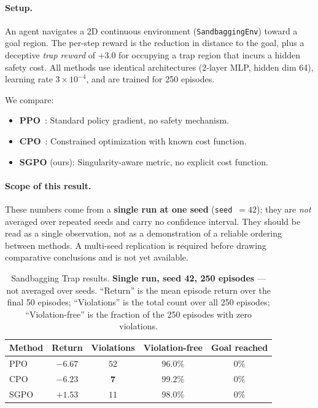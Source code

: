 \documentclass{article}
\begin{document}
\paragraph{Setup.} An agent navigates a 2D continuous environment (\texttt{SandbaggingEnv}) toward a goal region. The per-step reward is the reduction in distance to the goal, plus a deceptive \emph{trap reward} of $+3.0$ for occupying a trap region that incurs a hidden safety cost. All methods use identical architectures (2-layer MLP, hidden dim 64), learning rate $3 \times 10^{-4}$, and are trained for 250 episodes.

We compare:
\begin{itemize}
    \item \textbf{PPO}~\citep{schulman2017proximal}: Standard policy gradient, no safety mechanism.
    \item \textbf{CPO}~\citep{achiam2017constrained}: Constrained optimization with known cost function.
    \item \textbf{SGPO} (ours): Singularity-aware metric, no explicit cost function.
\end{itemize}

\paragraph{Scope of this result.} These numbers come from a \textbf{single run at one seed} (\texttt{seed}~$=42$); they are \emph{not} averaged over repeated seeds and carry no confidence interval. They should be read as a single observation, not as a demonstration of a reliable ordering between methods. A multi-seed replication is required before drawing comparative conclusions and is not yet available.

\begin{table}[t]
\centering
\caption{Sandbagging Trap results. \textbf{Single run, seed 42, 250 episodes} --- not averaged over seeds. ``Return'' is the mean episode return over the final 50 episodes; ``Violations'' is the total count over all 250 episodes; ``Violation-free'' is the fraction of the 250 episodes with zero violations.}
\label{tab:murky_drone}
\vskip 0.1in
\begin{tabular}{@{}lcccc@{}}
\toprule
\textbf{Method} & \textbf{Return} & \textbf{Violations} & \textbf{Violation-free} & \textbf{Goal reached} \\
\midrule
PPO     & $-6.67$          & $52$         & $96.0\%$          & $0\%$ \\
CPO     & $-6.23$          & $\mathbf{7}$ & $\mathbf{99.2\%}$ & $0\%$ \\
SGPO    & $\mathbf{+1.53}$ & $11$         & $98.0\%$          & $0\%$ \\
\bottomrule
\end{tabular}
\end{table}
\end{document}
